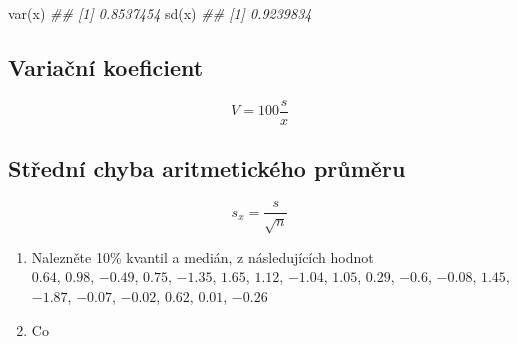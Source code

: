 \documentclass[
  letterpaper,
  DIV=11,
  numbers=noendperiod]{scrreprt}
\newenvironment{Shaded}{\begin{snugshade}}{\end{snugshade}}
\newcommand{\DocumentationTok}[1]{\textcolor[rgb]{0.37,0.37,0.37}{\textit{#1}}}
\newcommand{\FunctionTok}[1]{\textcolor[rgb]{0.28,0.35,0.67}{#1}}
\newcommand{\NormalTok}[1]{\textcolor[rgb]{0.00,0.23,0.31}{#1}}
\providecommand{\tightlist}{%
  \setlength{\itemsep}{0pt}\setlength{\parskip}{0pt}}\usepackage{longtable,booktabs,array}
\begin{document}
\begin{Shaded}
\begin{Highlighting}[]
\FunctionTok{var}\NormalTok{(x)}
\DocumentationTok{\#\# [1] 0.8537454}
\FunctionTok{sd}\NormalTok{(x)}
\DocumentationTok{\#\# [1] 0.9239834}
\end{Highlighting}
\end{Shaded}

\hypertarget{variaux10dnuxed-koeficient}{%
\subsection{Variační koeficient}\label{variaux10dnuxed-koeficient}}

\[
V = 100 \frac{s}{x}
\]

\hypertarget{stux159ednuxed-chyba-aritmetickuxe9ho-prux16fmux11bru}{%
\subsection{Střední chyba aritmetického
průměru}\label{stux159ednuxed-chyba-aritmetickuxe9ho-prux16fmux11bru}}

\[
s_x = \dfrac{s}{\sqrt{n}}
\]

\begin{tcolorbox}[enhanced jigsaw, toprule=.15mm, breakable, title=\textcolor{quarto-callout-tip-color}{\faLightbulb}\hspace{0.5em}{Cvičení}, colframe=quarto-callout-tip-color-frame, bottomrule=.15mm, left=2mm, leftrule=.75mm, colbacktitle=quarto-callout-tip-color!10!white, colback=white, bottomtitle=1mm, toptitle=1mm, opacityback=0, opacitybacktitle=0.6, arc=.35mm, coltitle=black, rightrule=.15mm, titlerule=0mm]

\begin{enumerate}
\def\labelenumi{\arabic{enumi}.}
\tightlist
\item
  Nalezněte 10\% kvantil a medián, z následujících hodnot\\
  \(0.64\), \(0.98\), \(-0.49\), \(0.75\), \(-1.35\), \(1.65\),
  \(1.12\), \(-1.04\), \(1.05\), \(0.29\), \(-0.6\), \(-0.08\),
  \(1.45\), \(-1.87\), \(-0.07\), \(-0.02\), \(0.62\), \(0.01\),
  \(-0.26\)\\
\item
  Co\\
\end{enumerate}

\end{tcolorbox}

\end{document}
